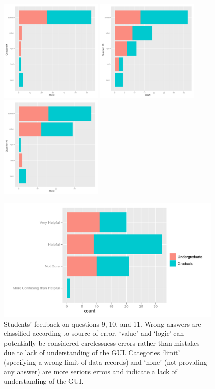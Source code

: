 \documentclass[11pt]{tise_style}
\begin{document}
\begin{figure}[htbp] %
   \centering
   \includegraphics[height=2in,  keepaspectratio=true]{fb-question-9.pdf} 
   \includegraphics[height=2in,  keepaspectratio=true]{fb-question-10.pdf} 
   \includegraphics[height=2in,  keepaspectratio=true]{fb-question-11.pdf} 
 
   \includegraphics[height=.25in, keepaspectratio=true]{fb-legend2.pdf} 
   \caption{Students' feedback on questions 9, 10, and 11. Wrong answers are classified according to source of error. `value' and `logic' can potentially be considered carelessness errors rather than mistakes due to lack of understanding of the GUI. Categories `limit' (specifying a wrong limit of data records) and `none' (not providing any answer) are more serious errors and indicate a lack of understanding of the GUI.} %
   \label{fb-errors}
\end{figure}
\end{document}
